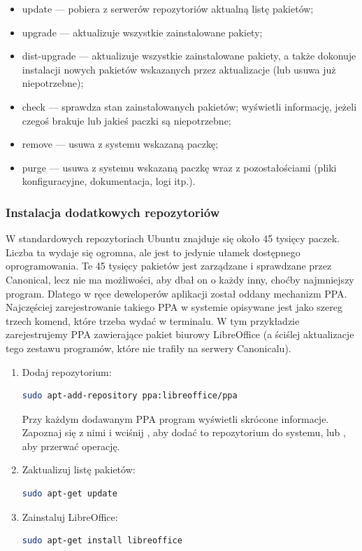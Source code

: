 \begin{itemize}
\item \textcolor{ubuntu_orange}{update} --- pobiera z serwerów repozytoriów aktualną listę pakietów;
\item \textcolor{ubuntu_orange}{upgrade} --- aktualizuje wszystkie zainstalowane pakiety;
\item \textcolor{ubuntu_orange}{dist-upgrade} --- aktualizuje wszystkie zainstalowane pakiety, a także dokonuje instalacji nowych pakietów wskazanych przez aktualizacje (lub usuwa już niepotrzebne);
\item \textcolor{ubuntu_orange}{check} --- sprawdza stan zainstalowanych pakietów; wyświetli informację, jeżeli czegoś brakuje lub jakieś paczki są niepotrzebne;
\item \textcolor{ubuntu_orange}{remove} --- usuwa z systemu wskazaną paczkę;
\item \textcolor{ubuntu_orange}{purge} --- usuwa z systemu wskazaną paczkę wraz z pozostałościami (pliki konfiguracyjne, dokumentacja, logi itp.).
\end{itemize}

\subsubsection{Instalacja dodatkowych repozytoriów}
W standardowych repozytoriach Ubuntu znajduje się około 45 tysięcy paczek. Liczba ta wydaje się ogromna, ale jest to jedynie ułamek dostępnego oprogramowania. Te 45 tysięcy pakietów jest zarządzane i sprawdzane przez Canonical, lecz nie ma możliwości, aby dbał on o każdy inny, choćby najmniejszy program. Dlatego w ręce deweloperów aplikacji został oddany mechanizm PPA. Najczęściej zarejestrowanie takiego PPA w systemie opisywane jest jako szereg trzech komend, które trzeba wydać w terminalu. W tym przykładzie zarejestrujemy PPA zawierające pakiet biurowy LibreOffice (a ściślej aktualizacje tego zestawu programów, które nie trafiły na serwery Canonicalu).
\begin{enumerate}
\item Dodaj repozytorium:
\begin{lstlisting}[language=bash]
sudo apt-add-repository ppa:libreoffice/ppa
\end{lstlisting}
Przy każdym dodawanym PPA program wyświetli skrócone informacje. Zapoznaj się z nimi i wciśnij \keys{\returnwin}, aby dodać to repozytorium do systemu, lub , aby przerwać operację.
\item Zaktualizuj listę pakietów:
\begin{lstlisting}[language=bash]
sudo apt-get update
\end{lstlisting}
\item Zainstaluj LibreOffice:
\begin{lstlisting}[language=bash]
sudo apt-get install libreoffice
\end{lstlisting}
\end{enumerate}

